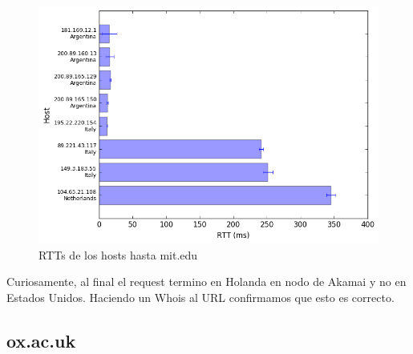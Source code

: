 \begin{figure}[H]
\caption{RTTs de los hosts hasta mit.edu}
\includegraphics[width=\textwidth,keepaspectratio]{images/mit.png}
\end{figure}

Curiosamente, al final el request termino en Holanda en nodo de Akamai y no en Estados Unidos. Haciendo un Whois al URL confirmamos que esto es correcto.

\pagebreak

\subsection{ox.ac.uk}

